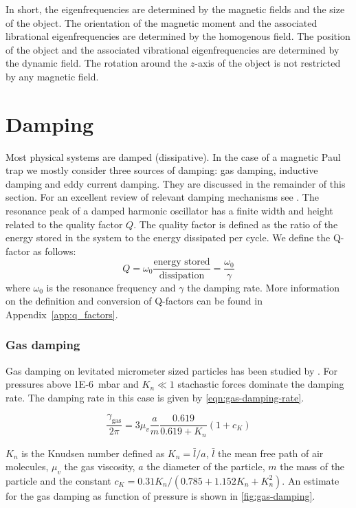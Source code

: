 In short, the eigenfrequencies are determined by the magnetic fields and the size of the object. The orientation of the magnetic moment and the associated librational eigenfrequencies are determined by the homogenous field. The position of the object and the associated vibrational eigenfrequencies are determined by the dynamic field. The rotation around the $z$-axis of the object is not restricted by any magnetic field.


\section{Damping}
\label{sec:damping}
Most physical systems are damped (dissipative). In the case of a magnetic Paul trap we mostly consider three sources of damping: gas damping, inductive damping and eddy current damping. They are discussed in the remainder of this section. For an excellent review of relevant damping mechanisms see \citeauthor{millen}. The resonance peak of a damped harmonic oscillator has a finite width and height related to the quality factor $Q$. The quality factor is defined as the ratio of the energy stored in the system to the energy dissipated per cycle. We define the Q-factor as follows:
\begin{equation*}
    Q = \omega_0 \frac{\text{energy stored}}{\text{dissipation}} = \frac{\omega_0}{\gamma}
\end{equation*}
where $\omega_0$ is the resonance frequency and $\gamma$ the damping rate. More information on the definition and conversion of Q-factors can be found in Appendix~\ref{app:q_factors}.

\subsubsection{Gas damping}
\label{subsubsec:gas-damping}
Gas damping on levitated micrometer sized particles has been studied by \citeauthor{millen}. For pressures above \qty{1E-6}{\milli\bar} and $K_n \ll 1$ stachastic forces dominate the damping rate. The damping rate in this case is given by \autoref{eqn:gas-damping-rate}.

\begin{equation}
    \frac{\gamma_{\text {gas}}}{2 \pi}=3 \mu_v \frac{a}{m} \frac{0.619}{0.619+K_n} \left( 1+c_K \right)
    \label{eqn:gas-damping-rate}
\end{equation}

$K_n$ is the Knudsen number defined as $K_n = \bar{l}/a$, $\bar{l}$ the mean free path of air molecules, $\mu_v$ the gas viscosity, $a$ the diameter of the particle, $m$ the mass of the particle and the constant $c_K = 0.31 K_n / \left(0.785 + 1.152 K_n + K_n^2 \right)$. An estimate for the gas damping as function of pressure is shown in \autoref{fig:gas-damping}.

